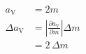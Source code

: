 \begin{align}
  a_\mathrm{V} &= 2 m \label{eq:a_V} \\
  \Delta a_\mathrm{V} &= \left|\frac{\partial a_\mathrm{V}}{\partial m}\right| \Delta m \nonumber \\
  &= 2\,\Delta m \label{eq:da_V}
\end{align}
